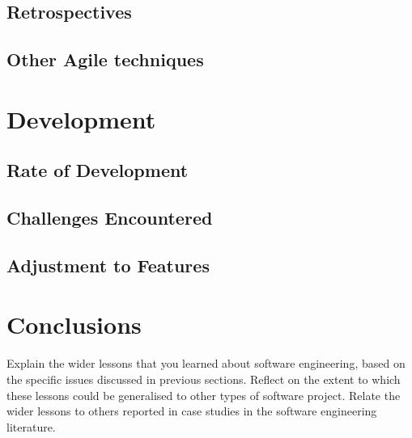 \documentclass{l3proj}
\begin{document}
\subsection{Retrospectives}

\subsection{Other Agile techniques}


\section{Development}
\label{sec:development}

\subsection{Rate of Development}

\subsection{Challenges Encountered}

\subsection{Adjustment to Features}



\section{Conclusions}
\label{sec:conclusions}

Explain the wider lessons that you learned about software engineering,
based on the specific issues discussed in previous sections.  Reflect
on the extent to which these lessons could be generalised to other
types of software project.  Relate the wider lessons to others
reported in case studies in the software engineering literature.



\end{document}
